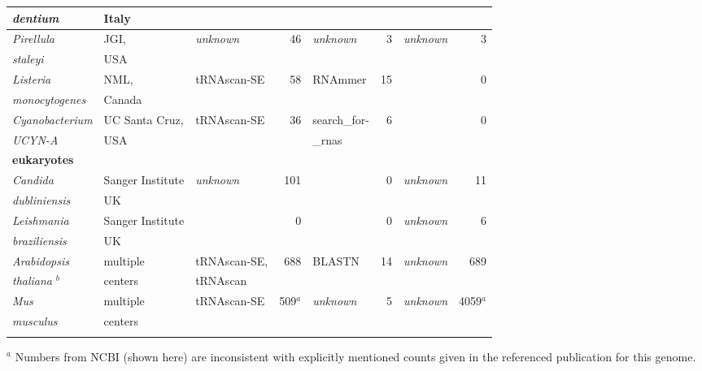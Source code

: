 \begin{table}
\begin{tabular}{|ll|lr|lr|lr|}
\emph{dentium} \cite{Ventura09}          & Italy             &               &          &                &    &                &          \\ \hline
\emph{Pirellula}                         & JGI,              &\emph{unknown} & 46       & \emph{unknown} &  3 & \emph{unknown} & 3        \\
\emph{staleyi} \cite{Clum09}             & USA               &               &          &                &    &                &          \\ \hline %
\emph{Listeria}                          & NML,              & tRNAscan-SE   & 58       & RNAmmer        & 15 &                & 0        \\
\emph{monocytogenes} \cite{Gilmour10}    & Canada            &               &          &                &    &                &          \\ \hline
\emph{Cyanobacterium}                    & UC Santa Cruz,    & tRNAscan-SE   & 36       & search\_for-   & 6  &                & 0        \\
\emph{UCYN-A} \cite{Tripp10}             & USA               &               &          & \_rnas         &    &                &          \\ \hline
\multicolumn{8}{l}{\textbf{eukaryotes}} \\ \hline
\emph{Candida}                           & Sanger Institute  &\emph{unknown} &     101  &                & 0  & \emph{unknown} & 11       \\
\emph{dubliniensis} \cite{Jackson09}     & UK                &               &          &                &    &                &          \\ \hline
\emph{Leishmania}                        & Sanger Institute  &               &       0  &                &  0 & \emph{unknown} & 6        \\
\emph{braziliensis} \cite{Peacock07}     & UK                &               &          &                &    &                &          \\ \hline
\emph{Arabidopsis}                       & multiple          & tRNAscan-SE,  & 688      & BLASTN         & 14 & \emph{unknown} & 689      \\
\emph{thaliana} \cite{Theologis00}$^b$   & centers           & tRNAscan      &          &                &    &                &          \\ \hline
\emph{Mus}                               & multiple          & tRNAscan-SE   & 509$^a$  & \emph{unknown} & 5  & \emph{unknown} & 4059$^a$ \\
\emph{musculus} \cite{Waterston02}       & centers           &               &          &                &    &                &          \\ %
\noalign{\smallskip}\hline\noalign{\smallskip}
\end{tabular}

$^a$ Numbers from NCBI (shown here) are inconsistent with explicitly mentioned counts given in the referenced publication for this genome.

\end{table}
